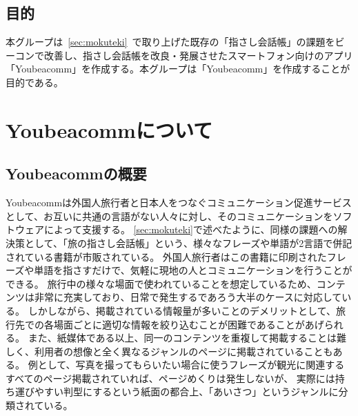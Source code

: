 \documentclass[openany,11pt,papersize]{jsbook}
\begin{document}
\section{目的}
 本グループは~\ref{sec:mokuteki}~で取り上げた既存の「指さし会話帳」の課題をビーコンで改善し、指さし会話帳を改良・発展させたスマートフォン向けのアプリ「Youbeacomm」を作成する。本グループは「Youbeacomm」を作成することが目的である。


\chapter{Youbeacommについて}

\section{Youbeacommの概要}
 Youbeacommは外国人旅行者と日本人をつなぐコミュニケーション促進サービスとして、お互いに共通の言語がない人々に対し、そのコミュニケーションをソフトウェアによって支援する。
\ref{sec:mokuteki}で述べたように、同様の課題への解決策として、「旅の指さし会話帳」という、様々なフレーズや単語が2言語で併記されている書籍が市販されている。
外国人旅行者はこの書籍に印刷されたフレーズや単語を指さすだけで、気軽に現地の人とコミュニケーションを行うことができる。
旅行中の様々な場面で使われていることを想定しているため、コンテンツは非常に充実しており、日常で発生するであろう大半のケースに対応している。
しかしながら、掲載されている情報量が多いことのデメリットとして、旅行先での各場面ごとに適切な情報を絞り込むことが困難であることがあげられる。
また、紙媒体である以上、同一のコンテンツを重複して掲載することは難しく、利用者の想像と全く異なるジャンルのページに掲載されていることもある。
例として、写真を撮ってもらいたい場合に使うフレーズが観光に関連するすべてのページ掲載されていれば、ページめくりは発生しないが、
実際には持ち運びやすい判型にするという紙面の都合上、「あいさつ」というジャンルに分類されている。
\end{document}
